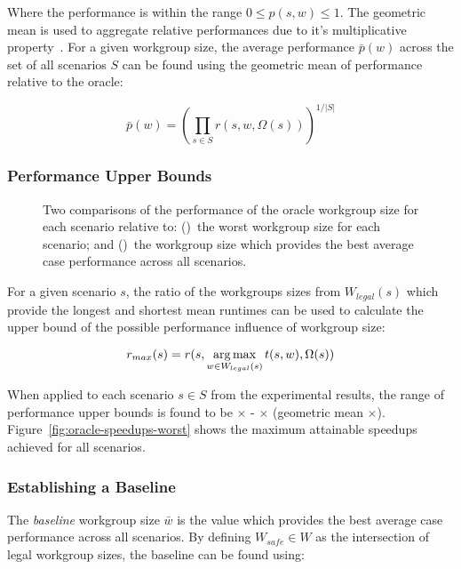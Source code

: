 Where the performance is within the range $0 \le p(s,w) \le 1$. The
geometric mean is used to aggregate relative performances due to it's
multiplicative property~\cite{Fleming1986}. For a given workgroup
size, the average performance $\bar{p}(w)$ across the set of all
scenarios $S$ can be found using the geometric mean of performance
relative to the oracle:

\begin{equation}
\bar{p}(w) =
\left(
  \prod_{s \in S} r(s, w, \Omega(s))
\right)^{1/|S|}
\end{equation}


\subsubsection{Performance Upper Bounds}

\begin{figure}

\caption{%
  Two comparisons of the performance of the oracle workgroup size for
  each scenario relative to: ()~the
  worst workgroup size for each scenario; and
  ()~the workgroup size which
  provides the best average case performance across all scenarios.%
}
\label{fig:speedups}
\end{figure}

For a given scenario $s$, the ratio of the workgroups sizes from
$W_{legal}(s)$ which provide the longest and shortest mean runtimes
can be used to calculate the upper bound of the possible performance
influence of workgroup size:

\begin{equation}
r_{max}(s) = r(s, \operatorname*{arg\,max}_{w \in W_{legal}(s)} t(s,w), \Omega(s))
\end{equation}

When applied to each scenario $s \in S$ from the experimental results,
the range of performance upper bounds is found to be
$\times$ -
$\times$ (geometric mean
$\times$). Figure~\ref{fig:oracle-speedups-worst}
shows the maximum attainable speedups achieved for all scenarios.


\subsubsection{Establishing a Baseline}

The \emph{baseline} workgroup size $\bar{w}$ is the value which
provides the best average case performance across all scenarios.  By
defining $W_{safe} \in W$ as the intersection of legal workgroup
sizes, the baseline can be found using:

